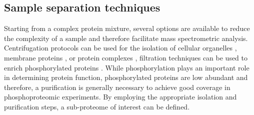 \subsection{Sample separation techniques}

Starting from a complex protein mixture, several options are available to
reduce the complexity of a sample and therefore facilitate mass spectrometric 
analysis.
Centrifugation protocols can be used for the isolation of cellular organelles
\citep{Huber2003}, membrane proteins \citep{Gilmore2010}, or protein complexes 
\citep{Puig2001}, filtration techniques can be used to enrich phosphorylated 
proteins \citep{Thingholm2008}.
While phosphorylation plays an important role in determining protein function,
phosphorylated proteins are low abundant and therefore, a purification is
generally necessary to achieve good coverage in phosphoproteomic experiments.
By employing the appropriate isolation and purification steps, a sub-proteome
of interest can be defined.

